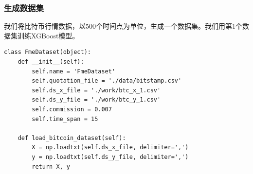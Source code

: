 \documentclass{article}
\begin{document}
\subsubsection{生成数据集}
我们将比特币行情数据，以500个时间点为单位，生成一个数据集。我们用第1个数据集训练XGBoost模型。
\begin{lstlisting}
class FmeDataset(object):
    def __init__(self):
        self.name = 'FmeDataset'
        self.quotation_file = './data/bitstamp.csv'
        self.ds_x_file = './work/btc_x_1.csv'
        self.ds_y_file = './work/btc_y_1.csv'
        self.commission = 0.007
        self.time_span = 15

    def load_bitcoin_dataset(self):
        X = np.loadtxt(self.ds_x_file, delimiter=',')
        y = np.loadtxt(self.ds_y_file, delimiter=',')
        return X, y


\end{lstlisting}
\end{document}
